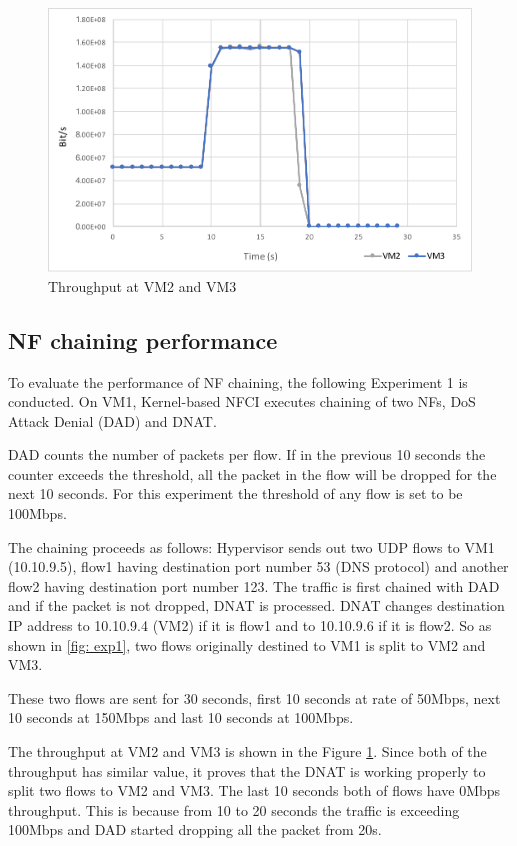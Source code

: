 \begin{figure}
	\centering
	\includegraphics[width=120mm]{pics/throughput.pdf}
	\caption{Throughput at VM2 and VM3}
	\label{fig: result1}
\end{figure}

\subsection{NF chaining performance}
To evaluate the performance of NF chaining, the following Experiment 1 is conducted. On VM1, Kernel-based NFCI executes chaining of two NFs, DoS Attack Denial (DAD) and DNAT. 

DAD counts the number of packets per flow. If in the previous 10 seconds the counter exceeds the threshold, all the packet in the flow will be dropped for the next 10 seconds. For this experiment the threshold of any flow is set to be 100Mbps. 

The chaining proceeds as follows: Hypervisor sends out two UDP flows to VM1 (10.10.9.5), flow1 having destination port number 53 (DNS protocol) and another flow2 having destination port number 123. The traffic is first chained with DAD and if the packet is not dropped, DNAT is processed. DNAT changes destination IP address to 10.10.9.4 (VM2) if it is flow1 and to 10.10.9.6 if it is flow2. So as shown in \ref{fig: exp1}, two flows originally destined to VM1 is split to VM2 and VM3. 

These two flows are sent for 30 seconds, first 10 seconds at rate of 50Mbps, next 10 seconds at 150Mbps and last 10 seconds at 100Mbps. 

The throughput at VM2 and VM3 is shown in the Figure \ref{fig: result1}.
Since both of the throughput has similar value, it proves that the DNAT is working properly to split two flows to VM2 and VM3. The last 10 seconds both of flows have 0Mbps throughput. This is because from 10 to 20 seconds the traffic is exceeding 100Mbps and DAD started dropping all the packet from 20s. 


